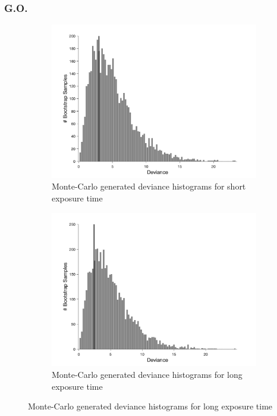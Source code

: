 \documentclass{article}
\begin{document}
\subsubsection*{G.O.}
\begin{figure}[!hb]
    \begin{subfigure}{0.494\textwidth}
        \centering
        \includegraphics[width = \linewidth]{Thesis/plots/gof/cutNo/cutNo_go_short_bootstrap.png}
        \caption{Monte-Carlo generated deviance histograms for short exposure time}
        \label{fig:da_gof_short_bootstrap}
    \end{subfigure}
    \hspace{0.01\textwidth}
    \begin{subfigure}{0.494\textwidth}
        \centering
        \includegraphics[width = \linewidth]{Thesis/plots/gof/cutNo/cutNo_go_long_bootstrap.png}
        \caption{Monte-Carlo generated deviance histograms for long exposure time}
        \label{fig:da_gof_long_bootstrap}
    \end{subfigure}
    

\end{figure}
\end{document}
